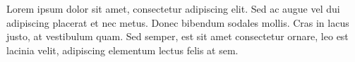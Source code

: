 Lorem ipsum dolor sit amet, consectetur adipiscing elit. Sed ac augue
vel dui adipiscing placerat et nec metus. Donec bibendum sodales mollis.
Cras in lacus justo, at vestibulum quam. Sed semper, est sit amet
consectetur ornare, leo est lacinia velit, adipiscing elementum lectus
felis at sem.

\newpage
